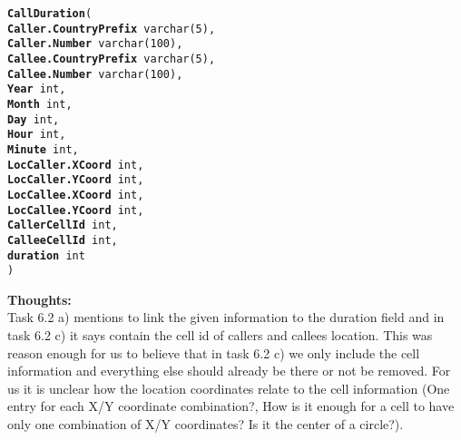 \documentclass{scrartcl}
\begin{document}
\begin{itemize}
\texttt{\textbf{CallDuration}(\\
	\hspace*{10mm}\textbf{Caller.CountryPrefix} varchar(5),\\
	\hspace*{10mm}\textbf{Caller.Number} varchar(100),\\
	\hspace*{10mm}\textbf{Callee.CountryPrefix} varchar(5),\\
	\hspace*{10mm}\textbf{Callee.Number} varchar(100),\\
	\hspace*{10mm}\textbf{Year} int,\\
	\hspace*{10mm}\textbf{Month} int,\\
	\hspace*{10mm}\textbf{Day} int,\\
	\hspace*{10mm}\textbf{Hour} int,\\
	\hspace*{10mm}\textbf{Minute} int,\\
	\hspace*{10mm}\textbf{LocCaller.XCoord} int,\\
	\hspace*{10mm}\textbf{LocCaller.YCoord} int,\\
	\hspace*{10mm}\textbf{LocCallee.XCoord} int,\\
	\hspace*{10mm}\textbf{LocCallee.YCoord} int,\\
	\hspace*{10mm}\textbf{CallerCellId} int,\\
	\hspace*{10mm}\textbf{CalleeCellId} int,\\
	\hspace*{10mm}\textbf{duration} int\\)}
	
	\textbf{Thoughts:}\\
Task 6.2 a) mentions to link the given information to the duration field and in task 6.2 c) it says contain the cell id of callers and callees location. This was reason enough for us to believe that in task 6.2 c) we only include the cell information and everything else should already be there or not be removed. 
For us it is unclear how the location coordinates relate to the cell information (One entry for each X/Y coordinate combination?, How is it enough for a cell to have only one combination of X/Y coordinates? Is it the center of a circle?). \\


\end{itemize}
\end{document}
